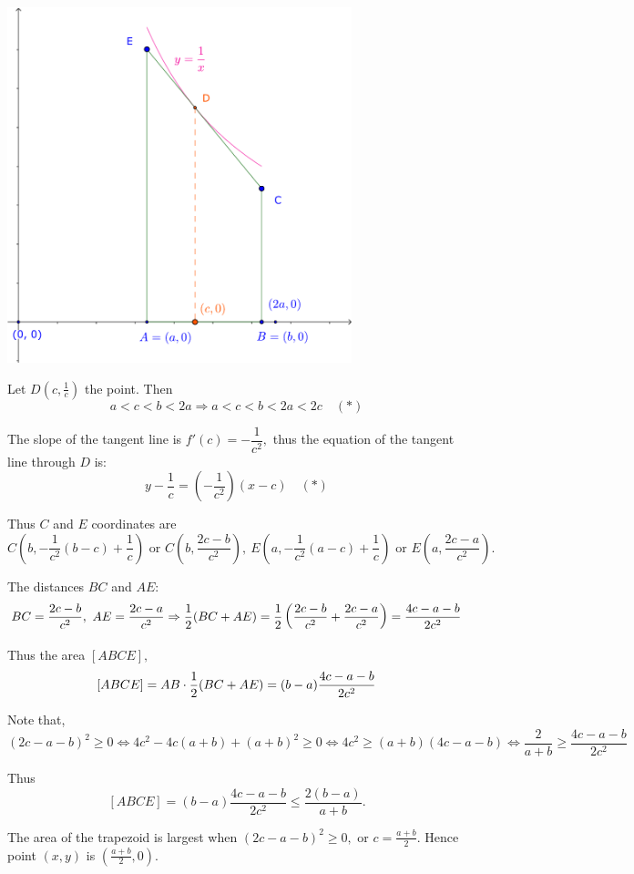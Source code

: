 \documentclass{article}
\begin{document}
\begin{center}
    \includegraphics[width=10cm]{./svg/pdf/derivative-2-5.pdf}
\end{center}

\begin{soln}
    Let $D \left(c, \frac{1}{c} \right)$ the point. Then 
    \[
        a < c < b < 2a \Rightarrow a < c < b < 2a < 2c \quad (*)
    \]
    
    The slope of the tangent line is $f'(c) = -\dfrac{1}{c^2},$ thus the equation of the tangent line through $D$ is:
    \[
        y -  \frac{1}{c} = \left( -\frac{1}{c^2} \right) (x-c) \quad (*)
    \]

    Thus $C$ and $E$ coordinates are
    \[
        C \left( b, -\frac{1}{c^2}(b-c) + \frac{1}{c} \right) \text{\ or\ } C\left( b, \frac{2c - b}{c^2} \right),\ 
        E \left( a, -\frac{1}{c^2}(a-c) + \frac{1}{c} \right) \text{\ or\ } E\left( a, \frac{2c - a}{c^2} \right).
    \]

    The distances $BC$ and $AE$:
    \[
        BC = \frac{2c - b}{c^2},\ AE = \frac{2c - a}{c^2}
        \Rightarrow \frac{1}{2}(BC + AE) = \frac{1}{2} \left( \frac{2c - b}{c^2} + \frac{2c - a}{c^2} \right) = \frac{4c - a - b}{2c^2}
    \]

    Thus the area $[ABCE],$
    \[
        [ABCE] = AB \cdot \frac{1}{2}(BC + AE) = (b-a)\frac{4c - a - b}{2c^2}
    \]

    Note that,
    \[
        (2c -a -b)^2 \ge 0 \Leftrightarrow  4c^2 - 4c(a+b) + (a+b)^2 \ge 0 \Leftrightarrow 4c^2 \ge (a+b) (4c-a-b) \Leftrightarrow \frac{2}{a+b} \ge \frac{4c - a - b}{2c^2}
    \]

    Thus 
    \[
        [ABCE] = (b-a)\frac{4c - a - b}{2c^2} \le \frac{2(b-a)}{a+b}.
    \]

    The area of the trapezoid is largest when $(2c -a -b)^2 \ge 0,$ or $c = \frac{a+b}{2}.$
    Hence point $(x,y)$ is $\left(\frac{a+b}{2}, 0\right).$
\end{soln}
\end{document}
